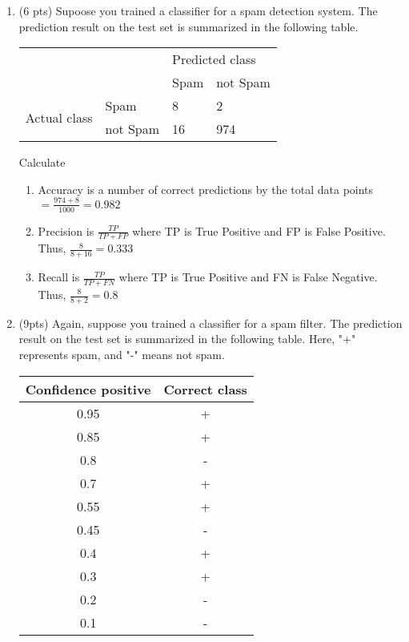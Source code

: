 \documentclass[a4paper]{article}
\theoremstyle{definition}
\newenvironment{soln}{
    \leavevmode\color{blue}\ignorespaces
}{}
\begin{document}
\begin{enumerate}
\item (6 pts) Supoose you trained a classifier for a spam detection system. The prediction result on the test set is summarized in the following table.
\begin{center}
	\begin{tabular}{l l | l l}
		&          & \multicolumn{2}{l}{Predicted class} \\
		&          & Spam           & not Spam           \\
		\hline
		\multirow{2}{*}{Actual class} & Spam     & 8              & 2                  \\
		& not Spam & 16             & 974               
	\end{tabular}
\end{center}

Calculate
\begin{enumerate}
	\item
	\begin{soln} 
	Accuracy is a number of correct predictions by the total data points $ = \frac{974 + 8}{1000} = 0.982$
	\end{soln}
	\item 
	\begin{soln}
	Precision is $\frac{TP}{TP + FP}$ where TP is True Positive and FP is False Positive. Thus, $\frac{8}{8 + 16} = 0.333$
	\end{soln}
	\item
	\begin{soln}
	Recall is $\frac{TP}{TP + FN}$ where TP is True Positive and FN is False Negative. Thus, $\frac{8}{8 + 2} = 0.8$
	\end{soln}
\end{enumerate}


\item (9pts) Again, suppose you trained a classifier for a spam filter. The prediction result on the test set is summarized in the following table. Here, "+" represents spam, and "-" means not spam.

\begin{center}
\begin{tabular}{ c  c }
\hline
Confidence positive & Correct class \\ \hline
0.95 & + \\
0.85 & + \\
0.8 & - \\
0.7 & + \\
0.55 & + \\
0.45 & - \\
0.4 & + \\
0.3 & + \\
0.2 & - \\
0.1 & - \\
\hline
\end{tabular}
\end{center}


\end{enumerate}
\end{document}
